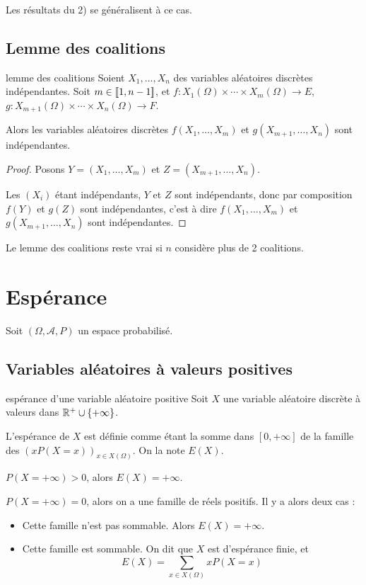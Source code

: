 Les résultats du 2) se généralisent à ce cas. 

\subsection{Lemme des coalitions} 

\begin{theoreme}{lemme des coalitions}{}
    Soient $X_1, \dots, X_n$ des variables aléatoires discrètes indépendantes. 
    Soit $m \in [\![1, n - 1]\!]$, et $f : X_1(\Omega) \times \cdots \times X_m(\Omega) \to E$,
    $g : X_{m + 1}(\Omega) \times \cdots \times X_n(\Omega) \to F$.

    Alors les variables aléatoires discrètes $f(X_1, \dots, X_m)$ et $g(X_{m + 1}, \dots, X_n)$ sont indépendantes.
\end{theoreme}

\begin{proof}
    Posons $Y = (X_1, \dots, X_m)$ et $Z = (X_{m + 1}, \dots, X_n)$.

    Les $(X_i)$ étant indépendants, $Y$ et $Z$ sont indépendants, donc par composition $f(Y)$ et $g(Z)$ sont indépendantes,
    c'est à dire $f(X_1, \dots, X_m)$ et $g(X_{m + 1}, \dots, X_n)$ sont indépendantes.
\end{proof}

\begin{proposition}{}{}
    Le lemme des coalitions reste vrai si $n$ considère plus de 2 coalitions. 
\end{proposition}

\section{Espérance}
Soit $(\Omega, \mathcal A, P)$ un espace probabilisé. 

\subsection{Variables aléatoires à valeurs positives}

\begin{definition}{espérance d'une variable aléatoire positive}{}
    Soit $X$ une variable aléatoire discrète à valeurs dans $\mathbb{R}^+ \cup \{+\infty\}$.

    L'espérance de $X$ est définie comme étant la somme dans $[0, + \infty]$ 
    de la famille des $(x P(X = x) )_{x \in X(\Omega)}$. On la note $E(X)$.

     $P(X = + \infty) > 0$, alors $E(X) = + \infty$.

     $P(X = + \infty) = 0$, alors on a une famille de réels positifs. 
    Il y a alors deux cas : 
    \begin{itemize}
        \item Cette famille n'est pas sommable. Alors $E(X) = + \infty$.
        \item Cette famille est sommable. On dit que $X$ est d'espérance finie, et 
        $$ E(X) = \sum_{x \in X(\Omega)} x P(X = x) $$
    \end{itemize}
\end{definition}

